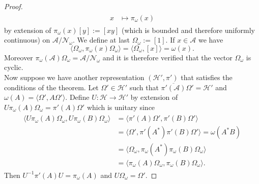 \begin{proof}
\begin{align}
\begin{split}
x&\mapsto \pi_\omega(x)
\end{split}
\end{align}
by extension of $\pi_\omega(x)[y]:=[xy]$ (which is bounded and therefore uniformly continuous) on $\mathcal{A}/\mathcal{N}_\omega$. We define at last $\Omega_\omega:=[1]$. If $x\in\mathcal{A}$ we have
\begin{equation}\label{eqn:state_representation}
\langle \Omega_\omega, \pi_\omega(x)\Omega_\omega\rangle = \langle \Omega_\omega, [x]\rangle = \omega(x). 
\end{equation}
Moreover $\pi_\omega(\mathcal{A})\Omega_\omega = \mathcal{A}/\mathcal{N}_\omega$ and it is therefore verified that the vector $\Omega_\omega$ is cyclic. \\ 
Now suppose we have another representation $(\mathcal{H}', \pi')$ that satisfies the conditions of the theorem. Let $\Omega'\in\mathcal{H}'$ such that $\overline{\pi'(\mathcal{A})}\Omega'=\mathcal{H}'$ and $\omega(A)=\langle \Omega',A\Omega'\rangle$. Define $U:\mathcal{H}\rightarrow \mathcal{H}'$ by extension of $U\pi_\omega(A)\Omega_\omega=\pi'(A)\Omega'$ which is unitary since
\begin{align}
\begin{split}
\langle U\pi_\omega(A)\Omega_\omega,U\pi_\omega(B)\Omega_\omega\rangle&= \langle \pi'(A)\Omega',\pi'(B)\Omega'\rangle \\
&= \langle \Omega',\pi'(A^*)\pi'(B)\Omega'\rangle=\omega(A^*B)\\
&=\langle \Omega_\omega, \pi_\omega(A^*)\pi_\omega(B)\Omega_\omega\rangle \\
&= \langle \pi_\omega(A)\Omega_\omega,\pi_\omega (B)\Omega_\omega\rangle.
\end{split}
\end{align}
Then $U^{-1}\pi'(A)U=\pi_\omega(A)$ and $U\Omega_\omega=\Omega'$.
\end{proof}

